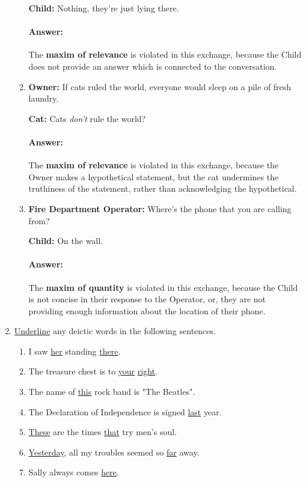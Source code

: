 \documentclass[letterpaper,12pt]{article}
\begin{document}
\begin{enumerate}
\begin{enumerate}[label=(\alph*).]
            \textbf{Child:} Nothing, they're just lying there.
        
            \paragraph{Answer:}
            The \textbf{maxim of relevance} is violated in this exchange, because the Child does
            not provide an answer which is connected to the conversation.


            
        \item \textbf{Owner:} If cats ruled the world, everyone would sleep on a pile of fresh laundry.


            \textbf{Cat:} Cats \textit{don't} rule the world?
            \paragraph{Answer:}
            The \textbf{maxim of relevance} is violated in this exchange, because the Owner makes a hypothetical statement,
            but the cat undermines the truthiness of the statement, rather than acknowledging the hypothetical.
        \item \textbf{Fire Department Operator:} Where's the phone that you are calling from?


            \textbf{Child:} On the wall.
            \paragraph{Answer:}
            The \textbf{maxim of quantity} is violated in this exchange, because the Child is not concise in their response to
            the Operator, or, they are not providing enough information about the location of their phone.
    \end{enumerate}
\item \underline{Underline} any deictic words in the following sentences.
    \begin{enumerate}[label=(\alph*).]
        \item I saw \underline{her} standing \underline{there}.
        \item The treasure chest is to \underline{your} \underline{right}.
        \item The name of \underline{this} rock band is "The Beatles". 
        \item The Declaration of Independence is signed \underline{last} year.
        \item \underline{These} are the times \underline{that} try men's soul.
        \item \underline{Yesterday}, all my troubles seemed so \underline{far} away.
        \item Sally always comes \underline{here}.
    \end{enumerate}


\end{enumerate}
\end{document}
